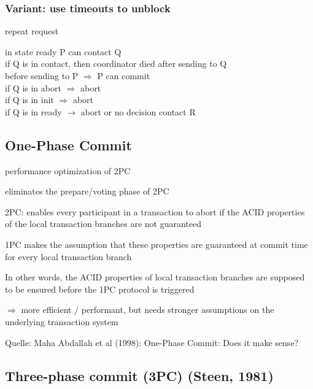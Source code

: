 \subsubsection*{Variant: use timeouts to unblock}
\begin{compactitem}
	\item repeat request
	\item in state ready P can contact Q\\
	if Q is in contact, then coordinator died after sending to Q\\
	before sending to P $\Rightarrow$ P can commit\\
	if Q is in abort $\Rightarrow$ abort\\
	if Q is in init $\Rightarrow$ abort\\
	if Q is in ready $\rightarrow$ abort or no decision contact R\\
\end{compactitem}

\subsection{One-Phase Commit}

\begin{compactitem}
	\item performance optimization of 2PC
	\item eliminates the prepare/voting phase of 2PC
	\item 2PC: enables every participant in a transaction to abort if the ACID properties of the local transaction branches are not guaranteed
	\item 1PC makes the assumption that these properties are guaranteed at commit time for every local transaction branch
	\item In other words, the ACID properties of local transaction branches are supposed to be ensured before the 1PC protocol is triggered
	\item $\Rightarrow$ more efficient / performant, but needs stronger assumptions on the underlying transaction system
	\item Quelle: Maha Abdallah et al (1998): One-Phase Commit: Does it make sense? 
\end{compactitem}

\subsection{Three-phase commit (3PC) (Steen, 1981)}

